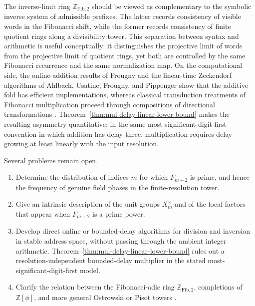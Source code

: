 \documentclass[12pt,a4paper]{article}
\theoremstyle{plain}
\theoremstyle{definition}
\numberwithin{equation}{section}
\newcommand{\ZZ}{\mathbb{Z}}
\begin{document}
The inverse-limit ring \(\ZZ_{\mathrm{Fib},2}\) should be viewed as complementary to the symbolic inverse system of admissible prefixes. The latter records consistency of visible words in the Fibonacci shift, while the former records consistency of finite quotient rings along a divisibility tower. This separation between syntax and arithmetic is useful conceptually: it distinguishes the projective limit of words from the projective limit of quotient rings, yet both are controlled by the same Fibonacci recurrence and the same normalization map. On the computational side, the online-addition results of Frougny and the linear-time Zeckendorf algorithms of Ahlbach, Usatine, Frougny, and Pippenger show that the additive fold has efficient implementations, whereas classical transduction treatments of Fibonacci multiplication proceed through compositions of directional transformations \cite{Frougny1999OnlineAddition,AhlbachUsatineFrougnyPippenger2013,HieronymiTerry2018OstrowskiAddition,Bernat2006FibonacciBase,Sakarovitch1987EasyMultiplications}. Theorem~\ref{thm:mul-delay-linear-lower-bound} makes the resulting asymmetry quantitative: in the same most-significant-digit-first convention in which addition has delay three, multiplication requires delay growing at least linearly with the input resolution.

Several problems remain open.
\begin{enumerate}[label=\arabic*.]
  \item Determine the distribution of indices \(m\) for which \(F_{m+2}\) is prime, and hence the frequency of genuine field phases in the finite-resolution tower.
  \item Give an intrinsic description of the unit groups \(X_m^\times\) and of the local factors that appear when \(F_{m+2}\) is a prime power.
  \item Develop direct online or bounded-delay algorithms for division and inversion in stable address space, without passing through the ambient integer arithmetic. Theorem~\ref{thm:mul-delay-linear-lower-bound} rules out a resolution-independent bounded-delay multiplier in the stated most-significant-digit-first model.
  \item Clarify the relation between the Fibonacci-adic ring \(\ZZ_{\mathrm{Fib},2}\), completions of \(\ZZ[\phi]\), and more general Ostrowski or Pisot towers \cite{Fraenkel1985,Zeckendorf1972Generalized}.
\end{enumerate}



\end{document}
